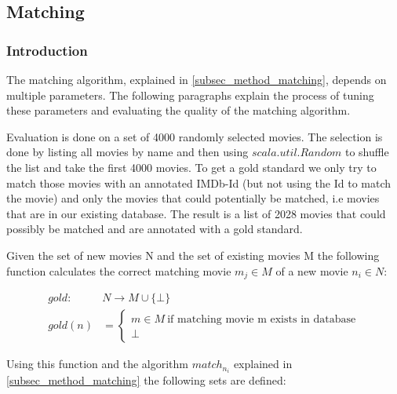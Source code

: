 \subsection{Matching}
\label{subsec_evaluation_matching}

\subsubsection{Introduction}
The matching algorithm, explained in \ref{subsec_method_matching}, depends on multiple parameters. The following paragraphs explain the process of tuning these parameters and evaluating the quality of the matching algorithm.

Evaluation is done on a set of 4000 randomly selected movies. The selection is done by listing all movies by name and then using $scala.util.Random$ to shuffle the list and take the first 4000 movies.
To get a gold standard we only try to match those movies with an annotated IMDb-Id (but not using the Id to match the movie) and only the movies that could potentially be matched, i.e movies that are in our existing database.
The result is a list of 2028 movies that could possibly be matched and are annotated with a gold standard.

Given the set of new movies N and the set of existing movies M the following function calculates the correct matching movie $m_{j} \in M$ of a new movie $n_{i} \in N$:

\begin{align}
	gold: ~&N \rightarrow M \cup \{\bot\} \\
	gold(n) &=
		\begin{cases}
		m \in M ~\text{if matching movie m exists in database}  \\
		\bot
		\end{cases}
\end{align}

Using this function and the algorithm $match_{n_{i}}$ explained in \ref{subsec_method_matching} the following sets are defined:

